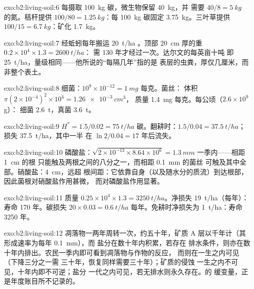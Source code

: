 \begin{solution}{exo:b2:living-soil:6}
每摄取 \qty{100}{kg} 碳，微生物保留 \qty{40}{kg}，并
需要 $40/8 = \qty{5}{kg}$ 的氮。秸秆提供 $100/80 =
\qty{1.25}{kg}$：每 \qty{100}{kg}
碳固定 \qty{3.75}{kg}。三叶草提供 $100/15 = \qty{6.7}{kg}$：矿化
\qty{1.7}{kg}。
\end{solution}

\begin{solution}{exo:b2:living-soil:7}
经蚯蚓每年搬运 \qty{20}{t/ha} 。顶部
\qty{20}{cm} 厚的重 $0.2\times 10^{4}\times 1.3 = \qty{2600}{t/ha}$：
需 130 年才经过一次。达尔文的每英亩十吨
即 \qty{25}{t/ha}，量级相同——他所说的“每隔几年”指的是
表层的虫粪，厚仅几厘米，而非整个表土。
\end{solution}

\begin{solution}{exo:b2:living-soil:8}
细菌：$10^{9}\times 10^{-12} = \qty{1}{mg}$ 每克。菌丝：
体积 $\pi(2\times 10^{-4})^{2}\times 10^{4} = \qty{1.26e-3}{cm^3}$，
质量 \qty{1.4}{mg} 每克。每公顷（$2.6\times 10^{9}$ g）：
细菌 \qty{2.6}{t}，真菌 \qty{3.6}{t}。
\end{solution}

\begin{solution}{exo:b2:living-soil:9}
$H^{*} = 1.5/0.02 = \qty{75}{t/ha}$ 碳。翻耕时：$1.5/0.04
= \qty{37.5}{t/ha}$；损失 \qty{37.5}{t/ha}，其中一半
在 $\ln 2/0.04 = 17$ 年后流失。
\end{solution}

\begin{solution}{exo:b2:living-soil:10}
磷酸盐：$\sqrt{2\times 10^{-13}\times 8.64\times 10^{6}} =
\qty{1.3}{mm}$ 一季内——相距 \qty{1}{cm} 的根
只能触及两根之间的八分之一，而相距 \qty{0.1}{mm} 的菌丝
可触及其中全部。硝酸盐：\qty{4}{cm}，远超
根间距：它依靠自身（以及随水分的质流）到达根部，
因此菌根对硝酸盐作用甚微，
而对磷酸盐作用显著。
\end{solution}

\begin{solution}{exo:b2:living-soil:11}
质量 $0.25\times 10^{4}\times 1.3 = \qty{3250}{t/ha}$。净损失
\qty{19}{t/ha}（每年）：寿命 170 年。碳损失 $20\times
0.03 = \qty{0.6}{t/ha}$ 每年。免耕时净损失为
\qty{1}{t/ha}：寿命 3250 年。
\end{solution}

\begin{solution}{exo:b2:living-soil:12}
凋落物一两年周转一次，约五十年，矿质 A
层以千年计（其形成速率为每年 \qty{0.1}{mm}），而
盐分在数十年内积累，若存在
排水条件，则亦在数十年内排出。农民一季内即可看到凋落物与作物的反应，
而则在一生之内可见（下降三分之一需
三十年，恢复同样需要三十年）；矿质的侵蚀
一生之内不可见，十年内即不可逆；盐分
一代之内可见，若无排水则永久存在。的
缓变量，正是年度账目所不记录的。
\end{solution}

